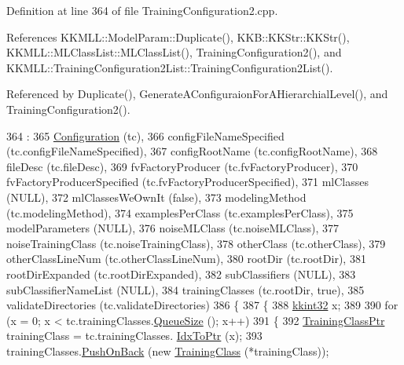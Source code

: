 Definition at line 364 of file Training\+Configuration2.\+cpp.



References K\+K\+M\+L\+L\+::\+Model\+Param\+::\+Duplicate(), K\+K\+B\+::\+K\+K\+Str\+::\+K\+K\+Str(), K\+K\+M\+L\+L\+::\+M\+L\+Class\+List\+::\+M\+L\+Class\+List(), Training\+Configuration2(), and K\+K\+M\+L\+L\+::\+Training\+Configuration2\+List\+::\+Training\+Configuration2\+List().



Referenced by Duplicate(), Generate\+A\+Configuraion\+For\+A\+Hierarchial\+Level(), and Training\+Configuration2().


\begin{DoxyCode}
364                                                                                 :
365   \hyperlink{class_k_k_b_1_1_configuration_a779947337bf652f0e773cb29f37f14ba}{Configuration} (tc),
366   configFileNameSpecified    (tc.configFileNameSpecified),
367   configRootName             (tc.configRootName),
368   fileDesc                   (tc.fileDesc),
369   fvFactoryProducer          (tc.fvFactoryProducer),
370   fvFactoryProducerSpecified (tc.fvFactoryProducerSpecified),
371   mlClasses                  (NULL),
372   mlClassesWeOwnIt           (\textcolor{keyword}{false}),
373   modelingMethod             (tc.modelingMethod),
374   examplesPerClass           (tc.examplesPerClass),
375   modelParameters            (NULL),
376   noiseMLClass               (tc.noiseMLClass),
377   noiseTrainingClass         (tc.noiseTrainingClass),
378   otherClass                 (tc.otherClass),
379   otherClassLineNum          (tc.otherClassLineNum),
380   rootDir                    (tc.rootDir),
381   rootDirExpanded            (tc.rootDirExpanded),
382   subClassifiers             (NULL),
383   subClassifierNameList      (NULL),
384   trainingClasses            (tc.rootDir, \textcolor{keyword}{true}),
385   validateDirectories        (tc.validateDirectories)
386 \{
387   \{
388     \hyperlink{namespace_k_k_b_a8fa4952cc84fda1de4bec1fbdd8d5b1b}{kkint32}  x;
389 
390     \textcolor{keywordflow}{for}  (x = 0;  x < tc.trainingClasses.\hyperlink{class_k_k_b_1_1_k_k_queue_a1dab601f75ee6a65d97f02bddf71c40d}{QueueSize} ();  x++)
391     \{
392       \hyperlink{class_k_k_m_l_l_1_1_training_class}{TrainingClassPtr}  trainingClass = tc.trainingClasses.
      \hyperlink{class_k_k_b_1_1_k_k_queue_acce2bdd8b3327e38266cf198382cd852}{IdxToPtr} (x);
393       trainingClasses.\hyperlink{class_k_k_b_1_1_k_k_queue_aa9fba4632b54268bf71ecb42dee0b575}{PushOnBack} (\textcolor{keyword}{new} \hyperlink{class_k_k_m_l_l_1_1_training_class}{TrainingClass} (*trainingClass));

\end{DoxyCode}
